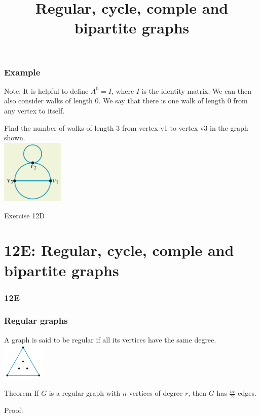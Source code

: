 \documentclass[
	11pt, %
]{beamer}
\begin{document}
\begin{frame}[t]
    \frametitle{Example}
    Note: It is helpful to define $A^0 = I$, where $I$ is the identity matrix. We can then also consider
    walks of length 0. We say that there is one walk of length 0 from any vertex to itself.\\
    \begin{block}{}
        Find the number of walks of length 3 from vertex v1 to vertex v3 in the graph shown.\\
    \includegraphics[width = 3cm]{Graph15.png}\\
    \end{block}
\end{frame}

\begin{frame}{Exercise 12D}
\end{frame}

\section{12E: Regular, cycle, comple and bipartite graphs}
\begin{frame}
    \frametitle{12E}
    \begin{center}
        \title{Regular, cycle, comple and bipartite graphs}
        \maketitle
    \end{center}
\end{frame}

\begin{frame}[t]
    \frametitle{Regular graphs}
    A graph is said to be regular if all its vertices have the same degree.\\
    \includegraphics[width = 2cm]{Regular.png}\\
    \begin{block}{Theorem}
        If $G$ is a regular graph with $n$ vertices of degree $r$, then $G$ has $\frac{nr}{2}$ edges.
    \end{block}
    Proof:
\end{frame}
\end{document}
